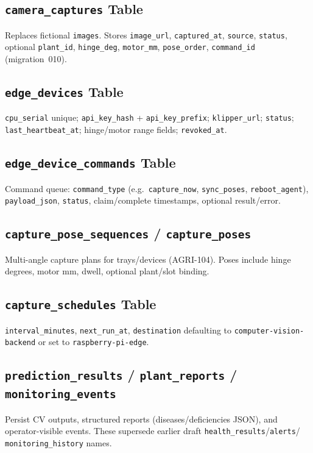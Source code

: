 \documentclass[11pt,letterpaper]{article}
\begin{document}
\subsection{\texttt{camera\_captures} Table}
Replaces fictional \texttt{images}. Stores \texttt{image\_url}, \texttt{captured\_at},
\texttt{source}, \texttt{status}, optional \texttt{plant\_id}, \texttt{hinge\_deg},
\texttt{motor\_mm}, \texttt{pose\_order}, \texttt{command\_id} (migration~010).

\subsection{\texttt{edge\_devices} Table}
\texttt{cpu\_serial} unique; \texttt{api\_key\_hash} + \texttt{api\_key\_prefix};
\texttt{klipper\_url}; \texttt{status}; \texttt{last\_heartbeat\_at}; hinge/motor range
fields; \texttt{revoked\_at}.

\subsection{\texttt{edge\_device\_commands} Table}
Command queue: \texttt{command\_type} (e.g.\ \texttt{capture\_now}, \texttt{sync\_poses},
\texttt{reboot\_agent}), \texttt{payload\_json}, \texttt{status}, claim/complete timestamps,
optional result/error.

\subsection{\texttt{capture\_pose\_sequences} / \texttt{capture\_poses}}
Multi-angle capture plans for trays/devices (AGRI-104). Poses include hinge degrees, motor mm,
dwell, optional plant/slot binding.

\subsection{\texttt{capture\_schedules} Table}
\texttt{interval\_minutes}, \texttt{next\_run\_at}, \texttt{destination} defaulting to
\texttt{computer-vision-backend} or set to \texttt{raspberry-pi-edge}.

\subsection{\texttt{prediction\_results} / \texttt{plant\_reports} / \texttt{monitoring\_events}}
Persist CV outputs, structured reports (diseases/deficiencies JSON), and operator-visible
events. These supersede earlier draft \texttt{health\_results}/\texttt{alerts}/
\texttt{monitoring\_history} names.
\end{document}
